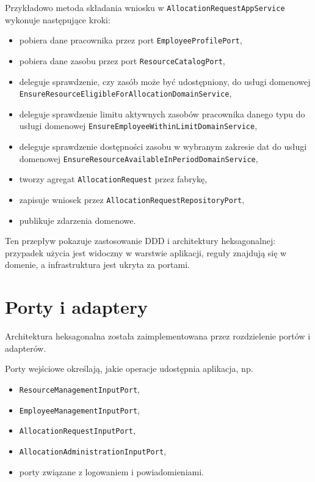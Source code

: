 Przykładowo metoda składania wniosku w \texttt{AllocationRequestAppService} wykonuje następujące kroki:
\begin{itemize}
    \item pobiera dane pracownika przez port \texttt{EmployeeProfilePort},
    \item pobiera dane zasobu przez port \texttt{ResourceCatalogPort},
    \item deleguje sprawdzenie, czy zasób może być udostępniony, do usługi domenowej \texttt{EnsureResourceEligibleForAllocationDomainService},
    \item deleguje sprawdzenie limitu aktywnych zasobów pracownika danego typu do usługi domenowej \texttt{EnsureEmployeeWithinLimitDomainService},
    \item deleguje sprawdzenie dostępności zasobu w wybranym zakresie dat do usługi domenowej \texttt{EnsureResourceAvailableInPeriodDomainService},
    \item tworzy agregat \texttt{AllocationRequest} przez fabrykę,
    \item zapisuje wniosek przez \texttt{AllocationRequestRepositoryPort},
    \item publikuje zdarzenia domenowe.
\end{itemize}

Ten przepływ pokazuje zastosowanie DDD i architektury heksagonalnej: przypadek użycia jest widoczny w warstwie aplikacji, reguły znajdują się w domenie, a infrastruktura jest ukryta za portami.

\section{Porty i adaptery}

Architektura heksagonalna została zaimplementowana przez rozdzielenie portów i adapterów.

Porty wejściowe określają, jakie operacje udostępnia aplikacja, np.
\begin{itemize}
    \item \texttt{ResourceManagementInputPort},
    \item \texttt{EmployeeManagementInputPort},
    \item \texttt{AllocationRequestInputPort},
    \item \texttt{AllocationAdministrationInputPort},
    \item porty związane z logowaniem i powiadomieniami.
\end{itemize}

